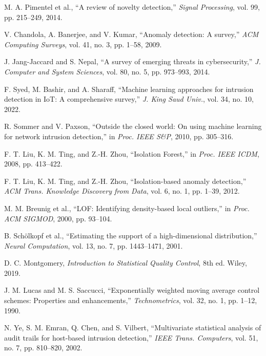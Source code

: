 \documentclass[13pt,a4paper,oneside]{report}
\begin{document}
\begin{enumerate}[label={[\arabic*]}]
\item M. A. Pimentel et al., ``A review of novelty detection,'' \textit{Signal Processing}, vol. 99, pp. 215--249, 2014.

\item V. Chandola, A. Banerjee, and V. Kumar, ``Anomaly detection: A survey,'' \textit{ACM Computing Surveys}, vol. 41, no. 3, pp. 1--58, 2009.

\item J. Jang-Jaccard and S. Nepal, ``A survey of emerging threats in cybersecurity,'' \textit{J. Computer and System Sciences}, vol. 80, no. 5, pp. 973--993, 2014.

\item F. Syed, M. Bashir, and A. Sharaff, ``Machine learning approaches for intrusion detection in IoT: A comprehensive survey,'' \textit{J. King Saud Univ.}, vol. 34, no. 10, 2022.

\item R. Sommer and V. Paxson, ``Outside the closed world: On using machine learning for network intrusion detection,'' in \textit{Proc. IEEE S\&P}, 2010, pp. 305--316.

\item F. T. Liu, K. M. Ting, and Z.-H. Zhou, ``Isolation Forest,'' in \textit{Proc. IEEE ICDM}, 2008, pp. 413--422.

\item F. T. Liu, K. M. Ting, and Z.-H. Zhou, ``Isolation-based anomaly detection,'' \textit{ACM Trans. Knowledge Discovery from Data}, vol. 6, no. 1, pp. 1--39, 2012.

\item M. M. Breunig et al., ``LOF: Identifying density-based local outliers,'' in \textit{Proc. ACM SIGMOD}, 2000, pp. 93--104.

\item B. Schölkopf et al., ``Estimating the support of a high-dimensional distribution,'' \textit{Neural Computation}, vol. 13, no. 7, pp. 1443--1471, 2001.

\item D. C. Montgomery, \textit{Introduction to Statistical Quality Control}, 8th ed. Wiley, 2019.

\item J. M. Lucas and M. S. Saccucci, ``Exponentially weighted moving average control schemes: Properties and enhancements,'' \textit{Technometrics}, vol. 32, no. 1, pp. 1--12, 1990.

\item N. Ye, S. M. Emran, Q. Chen, and S. Vilbert, ``Multivariate statistical analysis of audit trails for host-based intrusion detection,'' \textit{IEEE Trans. Computers}, vol. 51, no. 7, pp. 810--820, 2002.


\end{enumerate}
\end{document}
